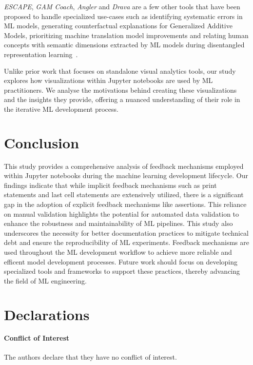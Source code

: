 \documentclass[smallextended]{svjour3}       %
\begin{document}
\textit{ESCAPE}, \textit{GAM Coach}, \textit{Angler} and \textit{Drava} are a few other tools that have been proposed to handle specialized use-cases such as identifying systematic errors in ML models, generating counterfactual explanations for Generalized Additive Models, prioritizing machine translation model improvements and relating human concepts with semantic dimensions extracted by ML models during disentangled representation learning~\citep{ahn2023escape,wang2023gam,robertson2023angler,wang2023drava}.

Unlike prior work that focuses on standalone visual analytics tools, our study explores how visualizations within Jupyter notebooks are used by ML practitioners. We analyse the motivations behind creating these visualizations and the insights they provide, offering a nuanced understanding of their role in the iterative ML development process.

\section{Conclusion}

This study provides a comprehensive analysis of feedback mechanisms employed within Jupyter notebooks during the machine learning development lifecycle. Our findings indicate that while implicit feedback mechanisms such as print statements and last cell statements are extensively utilized, there is a significant gap in the adoption of explicit feedback mechanisms like assertions. This reliance on manual validation highlights the potential for automated data validation to enhance the robustness and maintainability of ML pipelines. This study also underscores the necessity for better documentation practices to mitigate technical debt and ensure the reproducibility of ML experiments. Feedback mechanisms are used throughout the ML development workflow to achieve more reliable and efficent model development processes. Future work should focus on developing specialized tools and frameworks to support these practices, thereby advancing the field of ML engineering.

\section{Declarations}

\paragraph{\textbf{Conflict of Interest}} The authors declare that they have no conflict of interest.
\end{document}
